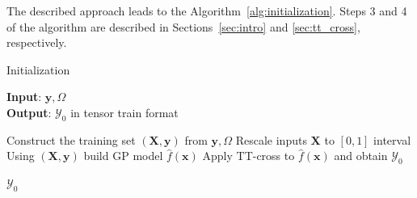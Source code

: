 The described approach leads to the Algorithm~\ref{alg:initialization}.
Steps 3 and 4 of the algorithm are described in
Sections~\ref{sec:intro} and \ref{sec:tt_cross}, respectively.

\begin{algorithm}
\caption{Initialization}
\label{alg:initialization}
    \hspace*{\algorithmicindent} \textbf{Input}: $\mathbf{y}, \Omega$ \\
    \hspace*{\algorithmicindent} \textbf{Output}: $\mathcal{Y}_0$ in tensor train format
    \begin{algorithmic}[1]
        \State Construct the training set $(\mathbf{X}, \mathbf{y})$ from $\mathbf{y}, \Omega$
        \State Rescale inputs $\mathbf{X}$ to $[0, 1]$ interval
        \State Using $(\mathbf{X}, \mathbf{y})$ build GP model $\hat{f}(\mathbf{x})$
        \State Apply TT-cross to $\hat{f}(\mathbf{x})$ and obtain $\mathcal{Y}_0$

        \State \Return $\mathcal{Y}_0$
    \end{algorithmic}
\end{algorithm}


